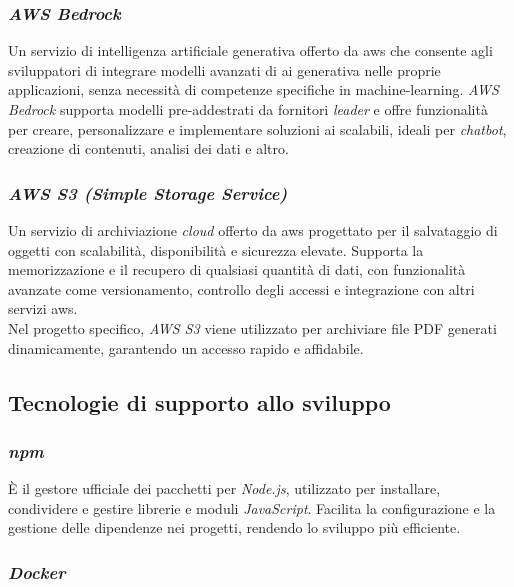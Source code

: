 \subsubsection{\textit{AWS Bedrock}}

Un servizio di intelligenza artificiale generativa offerto da \gls{aws} che consente agli sviluppatori di integrare modelli avanzati di \gls{ai} generativa nelle proprie applicazioni, senza necessità di competenze specifiche in \gls{machine-learning}. 
\textit{AWS Bedrock} supporta modelli pre-addestrati da fornitori \textit{leader} e offre funzionalità per creare, personalizzare e implementare soluzioni \gls{ai} scalabili, ideali per \textit{chatbot}, creazione di contenuti, analisi dei dati e altro.


\subsubsection{\textit{AWS S3 (Simple Storage Service)}}

Un servizio di archiviazione \textit{cloud} offerto da \gls{aws} progettato per il salvataggio di oggetti con scalabilità, disponibilità e sicurezza elevate. Supporta la memorizzazione e il recupero di qualsiasi quantità di dati, con funzionalità avanzate come versionamento, controllo degli accessi e integrazione con altri servizi \gls{aws}. \\
Nel progetto specifico, \textit{AWS S3} viene utilizzato per archiviare file PDF generati dinamicamente, garantendo un accesso rapido e affidabile.

\subsection{Tecnologie di supporto allo sviluppo}
\label{sez:tecnologie-supporto-sviluppo}

\subsubsection{\textit{\gls{npm}}}

È il gestore ufficiale dei pacchetti per \textit{Node.js}, utilizzato per installare, condividere e gestire librerie e moduli \textit{JavaScript}. 
Facilita la configurazione e la gestione delle dipendenze nei progetti, rendendo lo sviluppo più efficiente.

\subsubsection{\textit{Docker}}

